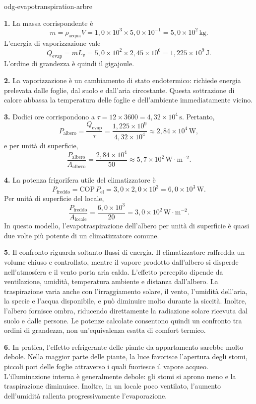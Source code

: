 \begin{exo}{odg-evapotranspiration-arbre}
\begin{solution}
\textbf{1.} La massa corrispondente è
\[
m=\rho_{\text{acqua}}V
=1{,}0\times10^3\times5{,}0\times10^{-1}
=5{,}0\times10^2\,\text{kg}.
\]
L'energia di vaporizzazione vale
\[
Q_{\mathrm{evap}}=mL_v
=5{,}0\times10^2\times2{,}45\times10^6
=1{,}225\times10^9\,\text{J}.
\]
L'ordine di grandezza è quindi il gigajoule.

\textbf{2.} La vaporizzazione è un cambiamento di stato endotermico: richiede energia prelevata dalle foglie, dal suolo e dall'aria circostante. Questa sottrazione di calore abbassa la temperatura delle foglie e dell'ambiente immediatamente vicino.

\textbf{3.} Dodici ore corrispondono a $\tau=12\times3600=4{,}32\times10^4\,\text{s}$. Pertanto,
\[
P_{\text{albero}}=\frac{Q_{\mathrm{evap}}}{\tau}
=\frac{1{,}225\times10^9}{4{,}32\times10^4}
\approx2{,}84\times10^4\,\text{W},
\]
e per unità di superficie,
\[
\frac{P_{\text{albero}}}{A_{\text{albero}}}
=\frac{2{,}84\times10^4}{50}
\approx5{,}7\times10^2\,\text{W}\!\cdot\!\text{m}^{-2}.
\]

\textbf{4.} La potenza frigorifera utile del climatizzatore è
\[
P_{\text{freddo}}=\mathrm{COP}\,P_{\mathrm{el}}
=3{,}0\times2{,}0\times10^3
=6{,}0\times10^3\,\text{W}.
\]
Per unità di superficie del locale,
\[
\frac{P_{\text{freddo}}}{A_{\text{locale}}}
=\frac{6{,}0\times10^3}{20}
=3{,}0\times10^2\,\text{W}\!\cdot\!\text{m}^{-2}.
\]
In questo modello, l'evapotraspirazione dell'albero per unità di superficie è quasi due volte più potente di un climatizzatore comune.

\textbf{5.} Il confronto riguarda soltanto flussi di energia. Il climatizzatore raffredda un volume chiuso e controllato, mentre il vapore prodotto dall'albero si disperde nell'atmosfera e il vento porta aria calda. L'effetto percepito dipende da ventilazione, umidità, temperatura ambiente e distanza dall'albero. La traspirazione varia anche con l'irraggiamento solare, il vento, l'umidità dell'aria, la specie e l'acqua disponibile, e può diminuire molto durante la siccità. Inoltre, l'albero fornisce ombra, riducendo direttamente la radiazione solare ricevuta dal suolo e dalle persone. Le potenze calcolate consentono quindi un confronto tra ordini di grandezza, non un'equivalenza esatta di comfort termico.

\textbf{6.} In pratica, l'effetto refrigerante delle piante da appartamento sarebbe molto debole. Nella maggior parte delle piante, la luce favorisce l'apertura degli stomi, piccoli pori delle foglie attraverso i quali fuoriesce il vapore acqueo. L'illuminazione interna è generalmente debole: gli stomi si aprono meno e la traspirazione diminuisce. Inoltre, in un locale poco ventilato, l'aumento dell'umidità rallenta progressivamente l'evaporazione.


\end{solution}
\end{exo}
